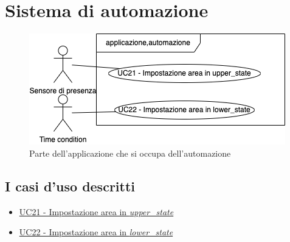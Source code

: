 \section{Sistema di automazione}

\begin{figure}[H]
    \includegraphics[width=\textwidth]{contenuti/img/casi_uso_grafici-applicazione,automazione.png}
    \caption{Parte dell'applicazione che si occupa dell'automazione}
    \label{fig:automazione}
\end{figure}

\subsection{I casi d'uso descritti}

\begin{itemize}
    \item \hyperref[uc:21]{UC21 - Impostazione area in \textit{upper\_state}}
    \item \hyperref[uc:22]{UC22 - Impostazione area in \textit{lower\_state}}
\end{itemize}
